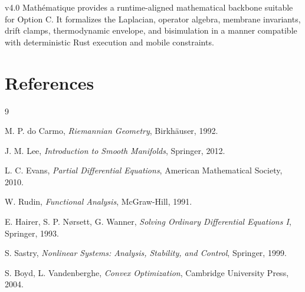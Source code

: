 \documentclass[11pt]{article}
\begin{document}
v4.0 Mathématique provides a runtime-aligned mathematical backbone suitable for
Option C. It formalizes the Laplacian, operator algebra, membrane invariants,
drift clamps, thermodynamic envelope, and bisimulation in a manner compatible
with deterministic Rust execution and mobile constraints.

\section{References}

\begin{thebibliography}{9}

M. P. do Carmo,
\textit{Riemannian Geometry},
Birkhäuser, 1992.

J. M. Lee,
\textit{Introduction to Smooth Manifolds},
Springer, 2012.

L. C. Evans,
\textit{Partial Differential Equations},
American Mathematical Society, 2010.

W. Rudin,
\textit{Functional Analysis},
McGraw-Hill, 1991.

E. Hairer, S. P. Nørsett, G. Wanner,
\textit{Solving Ordinary Differential Equations I},
Springer, 1993.

S. Sastry,
\textit{Nonlinear Systems: Analysis, Stability, and Control},
Springer, 1999.

S. Boyd, L. Vandenberghe,
\textit{Convex Optimization},
Cambridge University Press, 2004.

\end{thebibliography}
\end{document}
